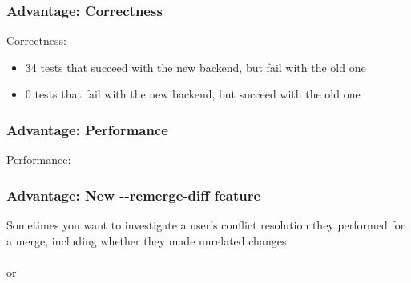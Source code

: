\documentclass[compress,t]{beamer}
\begin{document}
\begin{frame}
  \frametitle{Advantage: Correctness}

  Correctness:
  \begin{itemize}
    \item 34 tests that succeed with the new backend, but fail with the old one
    \item \hspace*{0.5em}0 tests that fail with the new backend, but succeed with the old one
  \end{itemize}

\end{frame}


\begin{frame}
  \frametitle{Advantage: Performance}

  Performance:\\

\end{frame}


\begin{frame}
  \frametitle{Advantage: New {-}{-}remerge-diff feature}

  Sometimes you want to investigate a user's conflict resolution they
  performed for a merge, including whether they made unrelated changes:\\
  \vspace*{\baselineskip}
  \qquad{}\\
  or\\
  \qquad{}

\end{frame}
\end{document}
